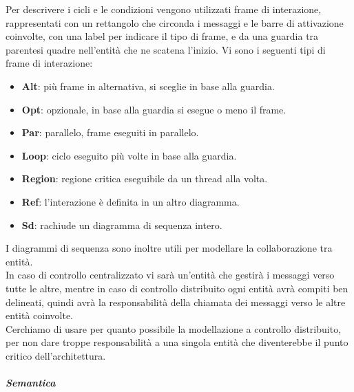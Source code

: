         Per descrivere i cicli e le condizioni vengono utilizzati frame di interazione, rappresentati con un rettangolo che circonda i messaggi e le barre di attivazione coinvolte, con una label per indicare il tipo di frame, e da una guardia tra parentesi quadre nell'entità che ne scatena l'inizio.
        Vi sono i seguenti tipi di frame di interazione:
        \begin{itemize}
            \item \textbf{Alt}: più frame in alternativa, si sceglie in base alla guardia.
            \item \textbf{Opt}: opzionale, in base alla guardia si esegue o meno il frame.
            \item \textbf{Par}: parallelo, frame eseguiti in parallelo.
            \item \textbf{Loop}: ciclo eseguito più volte in base alla guardia.
            \item \textbf{Region}: regione critica eseguibile da un thread alla volta.
            \item \textbf{Ref}: l'interazione è definita in un altro diagramma.
            \item \textbf{Sd}: rachiude un diagramma di sequenza intero.
        \end{itemize}
        I diagrammi di sequenza sono inoltre utili per modellare la collaborazione tra entità.\\
        In caso di controllo centralizzato vi sarà un'entità che gestirà i messaggi verso tutte le altre, mentre in caso di controllo distribuito ogni entità avrà compiti ben delineati, quindi avrà la responsabilità della chiamata dei messaggi verso le altre entità coinvolte.\\
        Cerchiamo di usare per quanto possibile la modellazione a controllo distribuito, per non dare troppe responsabilità a una singola entità che diventerebbe il punto critico dell'architettura.
        

		\subparagraph{Semantica} %


